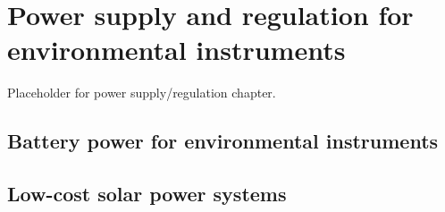 \setchapterpreamble[u]{\margintoc}
\chapter{\color{gray} Power supply and regulation for environmental instruments \color{black}}

Placeholder for power supply/regulation chapter.

\section{\color{gray} Battery power for environmental instruments \color{black}}

\section{\color{gray} Low-cost solar power systems \color{black}}
